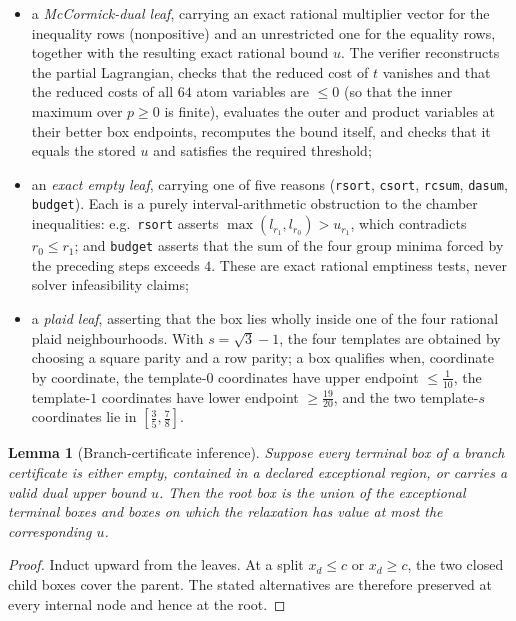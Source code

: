 \documentclass[11pt]{amsart}
\newtheorem{lemma}[theorem]{Lemma}
\theoremstyle{definition}
\theoremstyle{remark}
\begin{document}
\begin{itemize}
\item a \emph{McCormick-dual leaf}, carrying an exact rational multiplier vector for the inequality rows (nonpositive) and an unrestricted one for the equality rows, together with the resulting exact rational bound $u$. The verifier reconstructs the partial Lagrangian, checks that the reduced cost of $t$ vanishes and that the reduced costs of all $64$ atom variables are $\le0$ (so that the inner maximum over $p\ge0$ is finite), evaluates the outer and product variables at their better box endpoints, recomputes the bound itself, and checks that it equals the stored $u$ and satisfies the required threshold;
\item an \emph{exact empty leaf}, carrying one of five reasons (\texttt{rsort}, \texttt{csort}, \texttt{rcsum}, \texttt{dasum}, \texttt{budget}). Each is a purely interval-arithmetic obstruction to the chamber inequalities: e.g.\ \texttt{rsort} asserts $\max(l_{r_1},l_{r_0})>u_{r_1}$, which contradicts $r_0\le r_1$; and \texttt{budget} asserts that the sum of the four group minima forced by the preceding steps exceeds $4$. These are exact rational emptiness tests, never solver infeasibility claims;
\item a \emph{plaid leaf}, asserting that the box lies wholly inside one of the four rational plaid neighbourhoods. With $s=\sqrt3-1$, the four templates are obtained by choosing a square parity and a row parity; a box qualifies when, coordinate by coordinate, the template-$0$ coordinates have upper endpoint $\le\frac1{10}$, the template-$1$ coordinates have lower endpoint $\ge\frac{19}{20}$, and the two template-$s$ coordinates lie in $[\frac35,\frac78]$.
\end{itemize}

\begin{lemma}[Branch-certificate inference]\label{lem:branchsound}
Suppose every terminal box of a branch certificate is either empty, contained
in a declared exceptional region, or carries a valid dual upper bound $u$.
Then the root box is the union of the exceptional terminal boxes and boxes
on which the relaxation has value at most the corresponding $u$.
\end{lemma}

\begin{proof}
Induct upward from the leaves.  At a split $x_d\le c$ or $x_d\ge c$, the two
closed child boxes cover the parent.  The stated alternatives are therefore
preserved at every internal node and hence at the root.
\end{proof}
\end{document}
